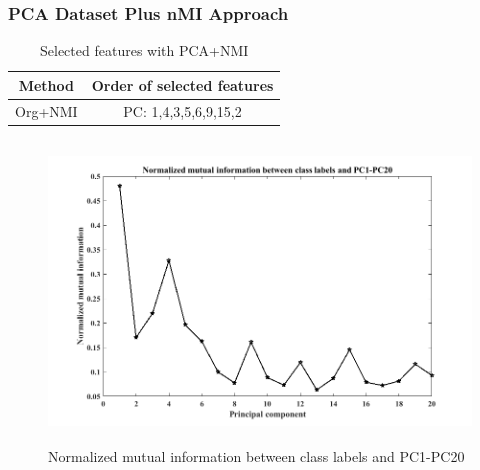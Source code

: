 \documentclass[document.tex]{subfiles}
\begin{document}
\subsubsection{PCA Dataset Plus nMI Approach}
\begin{table}[H]
	\caption{Selected features with PCA+NMI}
	\begin{center}
		\begin{tabular}{|c|c|}
			\hline
			Method & Order of selected features\\ \hline
			Org+NMI & PC: 1,4,3,5,6,9,15,2\\ \hline
		\end{tabular}
	\end{center}
	\label{tab:Selected features with PCA+NMI}
\end{table}
\begin{figure}[H]
	\begin{center}
		\includegraphics[height=8.0cm]{imgs/nmi.png}
	\end{center}
	\caption{Normalized mutual information between class labels and PC1-PC20}
	\label{fig:Normalized mutual information between class labels and PC1-PC20}
\end{figure}
\end{document}
